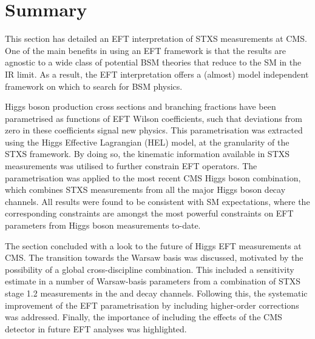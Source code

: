 \section{Summary}
This section has detailed an EFT interpretation of STXS measurements at CMS. One of the main benefits in using an EFT framework is that the results are agnostic to a wide class of potential BSM theories that reduce to the SM in the IR limit. As a result, the EFT interpretation offers a (almost) model independent framework on which to search for BSM physics. 

Higgs boson production cross sections and branching fractions have been parametrised as functions of EFT Wilson coefficients, such that deviations from zero in these coefficients signal new physics. This parametrisation was extracted using the Higgs Effective Lagrangian (HEL) model, at the granularity of the STXS framework. By doing so, the kinematic information available in STXS measurements was utilised to further constrain EFT operators. The parametrisation was applied to the most recent CMS Higgs boson combination, which combines STXS measurements from all the major Higgs boson decay channels. All results were found to be consistent with SM expectations, where the corresponding constraints are amongst the most powerful constraints on EFT parameters from Higgs boson measurements to-date. 

The section concluded with a look to the future of Higgs EFT measurements at CMS. The transition towards the Warsaw basis was discussed, motivated by the possibility of a global cross-discipline combination. This included a sensitivity estimate in a number of Warsaw-basis parameters from a combination of STXS stage 1.2 measurements in the \Hgg and \Hfl decay channels. Following this, the systematic improvement of the EFT parametrisation by including higher-order corrections was addressed. Finally, the importance of including the effects of the CMS detector in future EFT analyses was highlighted.

